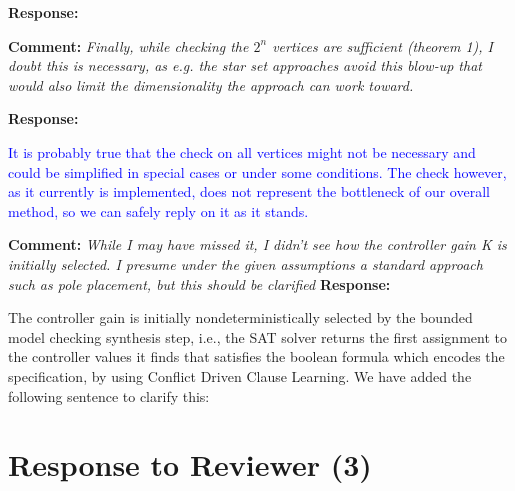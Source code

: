 \documentclass{article}
\newcommand{\rev}[1]{\textcolor{blue}{#1}}
\begin{document}
\vspace{1em}
{\bf Response: }


\vspace{2em}
{\bf Comment: }
{\itshape Finally, while checking the $2^n$ vertices
are sufficient (theorem 1), I doubt this is necessary, as e.g. the star set approaches avoid this blow-up that would also limit the dimensionality
the approach can work toward.}
\vspace{1em}

{\bf Response: }

\rev{It is probably true that the check on all vertices might not be necessary and could be simplified in special cases or under some conditions. The check however, as it currently is implemented, does not represent the bottleneck of our overall method, so we can safely reply on it as it stands. }

\vspace{2em}

{\bf Comment: }
{\itshape While I may have missed it, I didn't see how the controller gain K is initially selected. I presume under the given assumptions a standard approach
such as pole placement, but this should be clarified}
\vspace{1em}
{\bf Response: }

The controller gain is initially nondeterministically selected by the bounded model checking synthesis step, i.e., the SAT solver returns the first assignment to the controller
values it finds
that satisfies the boolean formula which encodes the specification, by using Conflict Driven Clause Learning.
We have added the following sentence to clarify this:

\vspace{2em}

\section{Response to Reviewer (3)}
\end{document}
